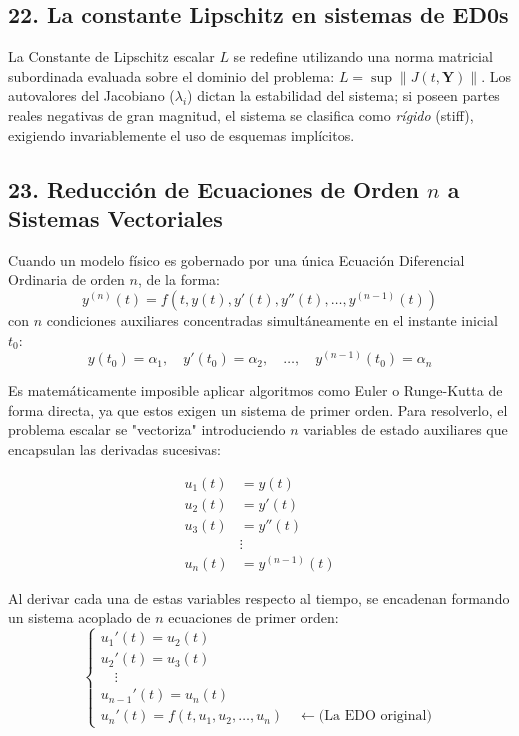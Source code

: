 \documentclass[12pt]{article}
\begin{document}
\subsection*{22. La constante Lipschitz en sistemas de ED0s}
La Constante de Lipschitz escalar $L$ se redefine utilizando una norma matricial subordinada evaluada sobre el dominio del problema: $L = \sup \|J(t, \mathbf{Y})\|$. Los autovalores del Jacobiano ($\lambda_i$) dictan la estabilidad del sistema; si poseen partes reales negativas de gran magnitud, el sistema se clasifica como \textit{rígido} (stiff), exigiendo invariablemente el uso de esquemas implícitos.

\subsection*{23. Reducción de Ecuaciones de Orden $n$ a Sistemas Vectoriales}

Cuando un modelo físico es gobernado por una única Ecuación Diferencial Ordinaria de orden $n$, de la forma:
\begin{equation}
    y^{(n)}(t) = f\left(t, y(t), y'(t), y''(t), \dots, y^{(n-1)}(t)\right)
\end{equation}
con $n$ condiciones auxiliares concentradas simultáneamente en el instante inicial $t_0$:
\begin{equation}
    y(t_0) = \alpha_1, \quad y'(t_0) = \alpha_2, \quad \dots, \quad y^{(n-1)}(t_0) = \alpha_n
\end{equation}

Es matemáticamente imposible aplicar algoritmos como Euler o Runge-Kutta de forma directa, ya que estos exigen un sistema de primer orden. Para resolverlo, el problema escalar se "vectoriza" introduciendo $n$ variables de estado auxiliares que encapsulan las derivadas sucesivas:

\begin{align*}
    u_1(t) &= y(t) \\
    u_2(t) &= y'(t) \\
    u_3(t) &= y''(t) \\
    &\vdots \\
    u_n(t) &= y^{(n-1)}(t)
\end{align*}

Al derivar cada una de estas variables respecto al tiempo, se encadenan formando un sistema acoplado de $n$ ecuaciones de primer orden:
\begin{equation}
\begin{cases}
    u_1'(t) = u_2(t) \\
    u_2'(t) = u_3(t) \\
    \quad \vdots \\
    u_{n-1}'(t) = u_n(t) \\
    u_n'(t) = f(t, u_1, u_2, \dots, u_n) \quad \leftarrow \text{(La EDO original)}
\end{cases}
\end{equation}
\end{document}

